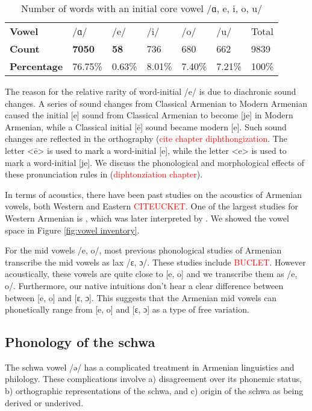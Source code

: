    \begin{table}[H]
   	\centering
   	\caption{Number of words with an initial core vowel /{ɑ, e, i, o, u}/}\label{tab: initial vowel number}
   	\begin{tabular}{| l| lllll| l| }
     \hline 
     \textbf{Vowel} & /{ɑ}/ & /{e}/ & /{i}/ & /{o}/ & /{u}/ & Total \\
     \textbf{Count} & \textbf{7050} & \textbf{58} & 736 & 680 & 662 & 9839 
     \\
     \textbf{Percentage} & 
     76.75\% & 0.63\% & 8.01\% & 7.40\% & 7.21\% & 100\%
     
     
     \\ \hline 
   	\end{tabular}
   \end{table}
   
   
   The reason for the relative rarity of word-initial /e/ is due to diachronic sound changes. A series of sound changes from Classical Armenian to Modern Armenian caused the initial [e] sound from Classical Armenian to become [je] in Modern Armenian, while a Classical initial [ē] sound became modern [e]. Such sound changes are reflected in the orthography (\textcolor{red}{cite chapter diphthongization}. The letter  <ē> is used to mark a word-initial [e], while the letter  <e> is used to mark a word-initial [je]. We discuss the phonological and morphological effects of these pronunciation rules in (\textcolor{red}{diphtonziation chapter}).
   
   
   In terms of acoustics, there have been past studies on the acoustics of Armenian vowels, both Western and Eastern \textcolor{red}{CITEUCKET}. One of the largest studies for Western Armenian is \citet{Toparlak-2019-MAArmenianPhonetics}, which was later interpreted by \citet{Seyfarth-JIPAArmenian}. We showed the vowel space in Figure \ref{fig:vowel inventory}. 
   
   For the mid vowels /e, o/, most previous phonological studies of Armenian transcribe the mid vowels as lax /ɛ, ɔ/. These studies include \textcolor{red}{BUCLET}. However acoustically, these vowels are quite close to [e, o] and we transcribe them as /e, o/. Furthermore, our native intuitions don't hear a clear difference between between [e, o] and [ɛ, ɔ]. This suggests that the Armenian mid vowels can phonetically range from [e, o] and [ɛ, ɔ] as a type of free variation. 
   
   
   
   
   \subsection{Phonology of the schwa}\label{section:segmentalPhono:vowel:schwa}
   The schwa vowel /ə/ has a complicated treatment in Armenian linguistics and philology. These complications involve a) disagreement over its phonemic status, b) orthographic representations of the schwa, and c) origin of the schwa as being derived or underived. 
   
